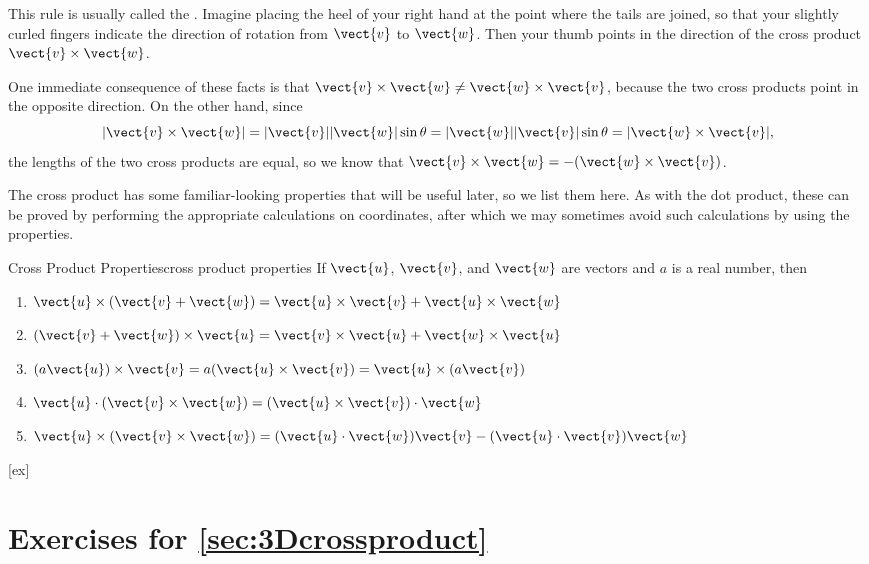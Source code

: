 This rule is usually called the .
Imagine placing the heel of your right hand at the point where the tails are
joined, so that your slightly curled fingers indicate the direction of
rotation from $\vect{v}$ to $\vect{w}$. Then your thumb points in the
direction of the cross product $\vect{v}\times\vect{w}$.

One immediate consequence of these facts is that 
$\vect{v}\times\vect{w}\not=\vect{w}\times\vect{v}$, because the two
cross products point in the opposite direction. On the other hand,
since 
$$
  |\vect{v}\times\vect{w}|=|\vect{v}||\vect{ w}|\sin\theta
  =|\vect{w}||\vect{v}|\sin\theta=|\vect{w}\times\vect{v}|,
$$
the lengths of the two cross products are equal, so
we know that $\vect{v}\times\vect{w}=-(\vect{w}\times\vect{v})$.

The cross product has some familiar-looking properties that will be
useful later, so we list them here. As with the dot product, these can
be proved by performing the appropriate calculations on coordinates,
after which we may sometimes avoid such calculations by using the
properties. 

\begin{theorem}{Cross Product Properties}{cross product properties}
If $\vect{u}$, $\vect{v}$, and $\vect{w}$ are vectors and $a$ is a real
number, then
\begin{enumerate}
	\item	$\vect{u}\times(\vect{v}+\vect{w}) = 
	\vect{u}\times\vect{v}+\vect{u}\times\vect{w}$
	\item	$(\vect{v}+\vect{w})\times\vect{u} = 
	\vect{v}\times\vect{u}+\vect{w}\times\vect{u}$
	\item	$(a\vect{u})\times\vect{v}=a(\vect{u}\times\vect{v})
	=\vect{u}\times(a\vect{v})$
	\item	$\vect{u}\cdot(\vect{v}\times\vect{w}) = 
	(\vect{u}\times\vect{v})\cdot\vect{w}$
	\item	$\vect{u}\times(\vect{v}\times\vect{w}) =
	(\vect{u}\cdot\vect{w})\vect{v}-(\vect{u}\cdot\vect{v})\vect{w}$
\end{enumerate}
\end{theorem}


[ex]
\section*{Exercises for \ref{sec:3Dcrossproduct}}

